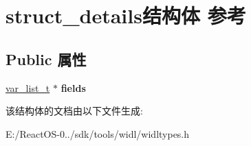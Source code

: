 \hypertarget{structstruct__details}{}\section{struct\+\_\+details结构体 参考}
\label{structstruct__details}
\subsection*{Public 属性}
\begin{DoxyCompactItemize}
\item 
\mbox{\label{structstruct__details_a071b414cbaaca8ab6841d259d5533730}} 
\hyperlink{classlist}{var\+\_\+list\+\_\+t} $\ast$ {\bfseries fields}
\end{DoxyCompactItemize}


该结构体的文档由以下文件生成\+:\begin{DoxyCompactItemize}
\item 
E\+:/\+React\+O\+S-\/0../sdk/tools/widl/widltypes.\+h\end{DoxyCompactItemize}
